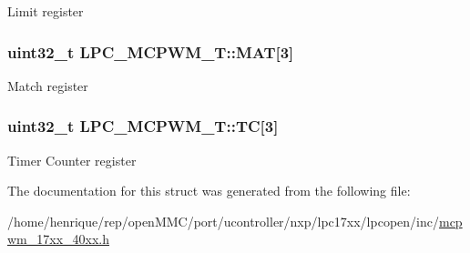 Limit register \hypertarget{structLPC__MCPWM__T_ac3b16a52a48e436af60d17ce27c5c879}{
\subsubsection[{M\-A\-T}]{ uint32\-\_\-t L\-P\-C\-\_\-\-M\-C\-P\-W\-M\-\_\-\-T\-::\-M\-A\-T\mbox{[}3\mbox{]}}}\label{structLPC__MCPWM__T_ac3b16a52a48e436af60d17ce27c5c879}
Match register \hypertarget{structLPC__MCPWM__T_ae6960477ec37aa32fbb20956cf01edb7}{
\subsubsection[{T\-C}]{ uint32\-\_\-t L\-P\-C\-\_\-\-M\-C\-P\-W\-M\-\_\-\-T\-::\-T\-C\mbox{[}3\mbox{]}}}\label{structLPC__MCPWM__T_ae6960477ec37aa32fbb20956cf01edb7}
Timer Counter register 

The documentation for this struct was generated from the following file\-:\begin{DoxyCompactItemize}
\item 
/home/henrique/rep/open\-M\-M\-C/port/ucontroller/nxp/lpc17xx/lpcopen/inc/\hyperlink{mcpwm__17xx__40xx_8h}{mcpwm\-\_\-17xx\-\_\-40xx.\-h}\end{DoxyCompactItemize}
